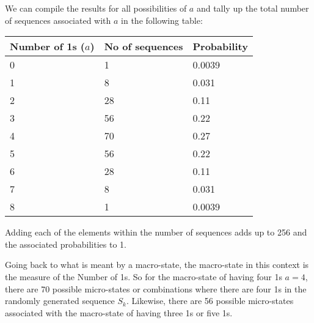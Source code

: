 \vspace{0,3cm}
We can compile the results for all possibilities of $a$ and tally up the total number of sequences associated with $a$ in the following table:
\begin{center}
\begin{tabular}{ |p{3cm}||p{3cm}||p{3cm}|  }
 \hline
Number of 1s ($a$)& No of sequences & Probability\\
 \hline
 0   & 1 &0.0039\\
 1&   8 &0.031\\
 2&28& 0.11 \\
 3&56 & 0.22\\
 4&70 &0.27\\
 5&56 & 0.22\\
 6&28 & 0.11\\
 7&8 & 0.031\\
 8&1 & 0.0039\\
 \hline
\end{tabular}
\end{center} 
Adding each of the elements within the number of sequences adds up to 256 and the associated probabilities to 1. \par

\vspace{0,3cm}
Going back to what is meant by a macro-state, the macro-state in this context is the measure of the Number of 1s. So for the macro-state of having four 1s $a=4$, there are 70 possible micro-states or combinations where there are four 1s in the randomly generated sequence $S_{k}$. Likewise, there are 56 possible micro-states associated with the macro-state of having three 1s or five 1s. \par

